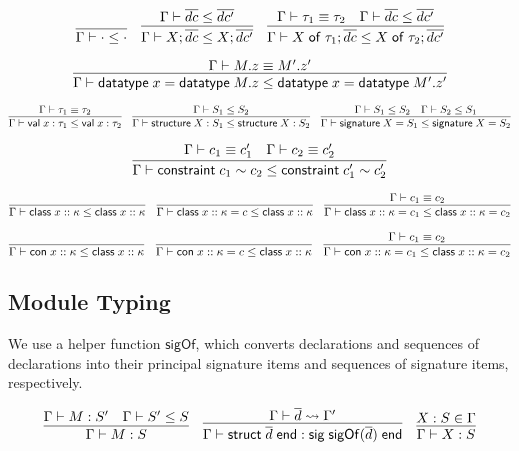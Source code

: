 \documentclass{article}
\newcommand{\mt}[1]{\mathsf{#1}}
\begin{document}
$$\infer{\Gamma \vdash \cdot \leq \cdot}{}
\quad \infer{\Gamma \vdash X; \overline{dc} \leq X; \overline{dc'}}{
  \Gamma \vdash \overline{dc} \leq \overline{dc'}
}
\quad \infer{\Gamma \vdash X \; \mt{of} \; \tau_1; \overline{dc} \leq X \; \mt{of} \; \tau_2; \overline{dc'}}{
  \Gamma \vdash \tau_1 \equiv \tau_2
  & \Gamma \vdash \overline{dc} \leq \overline{dc'}
}$$

$$\infer{\Gamma \vdash \mt{datatype} \; x = \mt{datatype} \; M.z \leq \mt{datatype} \; x = \mt{datatype} \; M'.z'}{
  \Gamma \vdash M.z \equiv M'.z'
}$$

$$\infer{\Gamma \vdash \mt{val} \; x : \tau_1 \leq \mt{val} \; x : \tau_2}{
  \Gamma \vdash \tau_1 \equiv \tau_2
}
\quad \infer{\Gamma \vdash \mt{structure} \; X : S_1 \leq \mt{structure} \; X : S_2}{
  \Gamma \vdash S_1 \leq S_2
}
\quad \infer{\Gamma \vdash \mt{signature} \; X = S_1 \leq \mt{signature} \; X = S_2}{
  \Gamma \vdash S_1 \leq S_2
  & \Gamma \vdash S_2 \leq S_1
}$$

$$\infer{\Gamma \vdash \mt{constraint} \; c_1 \sim c_2 \leq \mt{constraint} \; c'_1 \sim c'_2}{
  \Gamma \vdash c_1 \equiv c'_1
  & \Gamma \vdash c_2 \equiv c'_2
}$$

$$\infer{\Gamma \vdash \mt{class} \; x :: \kappa \leq \mt{class} \; x :: \kappa}{}
\quad \infer{\Gamma \vdash \mt{class} \; x :: \kappa = c \leq \mt{class} \; x :: \kappa}{}
\quad \infer{\Gamma \vdash \mt{class} \; x :: \kappa = c_1 \leq \mt{class} \; x :: \kappa = c_2}{
  \Gamma \vdash c_1 \equiv c_2
}$$

$$\infer{\Gamma \vdash \mt{con} \; x :: \kappa \leq \mt{class} \; x :: \kappa}{}
\quad \infer{\Gamma \vdash \mt{con} \; x :: \kappa = c \leq \mt{class} \; x :: \kappa}{}
\quad \infer{\Gamma \vdash \mt{con} \; x :: \kappa = c_1 \leq \mt{class} \; x :: \kappa = c_2}{
  \Gamma \vdash c_1 \equiv c_2
}$$

\subsection{Module Typing}

We use a helper function $\mt{sigOf}$, which converts declarations and sequences of declarations into their principal signature items and sequences of signature items, respectively.

$$\infer{\Gamma \vdash M : S}{
  \Gamma \vdash M : S'
  & \Gamma \vdash S' \leq S
}
\quad \infer{\Gamma \vdash \mt{struct} \; \overline{d} \; \mt{end} : \mt{sig} \; \mt{sigOf}(\overline{d}) \; \mt{end}}{
  \Gamma \vdash \overline{d} \leadsto \Gamma'
}
\quad \infer{\Gamma \vdash X : S}{
  X : S \in \Gamma
}$$
\end{document}
